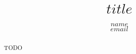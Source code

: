 \documentclass[11pt,a4paper]{article}
\begin{document}
\title{$title$}
\author{$name$ \\ \href{mailto:$email$}{$email$}}

\date{}
\maketitle

\begin{abstract}
    TODO
\end{abstract}


% 

\end{document}
